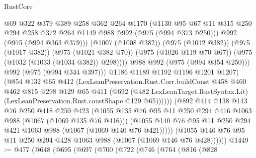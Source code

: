 \begin{lexlean}{RustCore}
\begin{coremodule}
                            @69
                            @322
                            @379
                            @389
                            @258
                            @362
                            @264
                            @1170
                            (@1130
                              @95
                              @67
                              @11
                              @315
                              @250
                              @294
                              @258
                              @372
                              @264
                              @1149
                              @988
                              @992
                              (@975 (@994 @373 @250)))
                            @992
                            (@975 (@994 @363 @379)))
                          (@1007 (@1008 @382))
                          (@975 (@1012 @382))
                          (@975 (@1017 @382))
                          (@975 (@1021 @382 @70))
                          (@975 (@1026 @119 @70 @67))
                          (@975 (@1032 (@1033 (@1034 @382)) @298))))
                      @988
                      @992
                      (@975 (@994 @354 @250)))
                    @992
                    (@975 (@994 @344 @397)))
                  @1186
                  @1189
                  @1192
                  @1196
                  @1201
                  @1207)
                (@854
                  @132
                  @65
                  @412
                  (LexLeanPreservation.Rust.Corr.buildConst
                    @458
                    @460
                    @462
                    @815
                    @298
                    @129
                    @65
                    @411
                    (@692
                      (@482 LexLeanTarget.RustSyntax.Lit)
                      (LexLeanPreservation.Rust.constShape @129 @65))))))
            (@892
              @414
              @138
              @143
              @76
              @250
              @418
              @250
              @423
              (@1055 @135 @76 @95 @11 @250 @294 @416 @1063 @988 (@1067 (@1069 @135 @76 @416)))
              (@1055 @140 @76 @95 @11 @250 @294 @421 @1063 @988 (@1067 (@1069 @140 @76 @421)))))
          (@1055 @146 @76 @95 @11 @250 @294 @428 @1063 @988 (@1067 (@1069 @146 @76 @428))))))
@1449 := @477
    (@648
      (@695
        (@697
          (@700
            (@722
              (@746
                (@764
                  (@816
                    (@828

\end{coremodule}
\end{lexlean}

